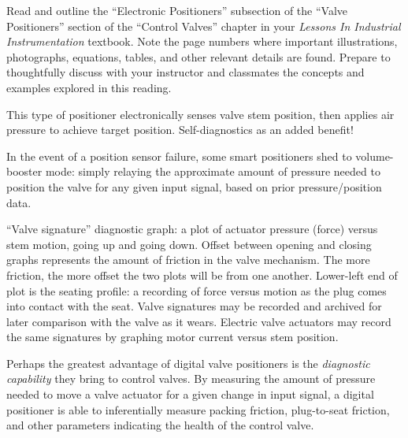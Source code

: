 

Read and outline the ``Electronic Positioners'' subsection of the ``Valve Positioners'' section of the ``Control Valves'' chapter in your {\it Lessons In Industrial Instrumentation} textbook.  Note the page numbers where important illustrations, photographs, equations, tables, and other relevant details are found.  Prepare to thoughtfully discuss with your instructor and classmates the concepts and examples explored in this reading.







 






This type of positioner electronically senses valve stem position, then applies air pressure to achieve target position.  Self-diagnostics as an added benefit!

\vskip 10pt

In the event of a position sensor failure, some smart positioners shed to volume-booster mode: simply relaying the approximate amount of pressure needed to position the valve for any given input signal, based on prior pressure/position data.

\vskip 10pt

``Valve signature'' diagnostic graph: a plot of actuator pressure (force) versus stem motion, going up and going down.  Offset between opening and closing graphs represents the amount of friction in the valve mechanism.  The more friction, the more offset the two plots will be from one another.  Lower-left end of plot is the seating profile: a recording of force versus motion as the plug comes into contact with the seat.  Valve signatures may be recorded and archived for later comparison with the valve as it wears.  Electric valve actuators may record the same signatures by graphing motor current versus stem position.


\vskip 10pt

Perhaps the greatest advantage of digital valve positioners is the {\it diagnostic capability} they bring to control valves.  By measuring the amount of pressure needed to move a valve actuator for a given change in input signal, a digital positioner is able to inferentially measure packing friction, plug-to-seat friction, and other parameters indicating the health of the control valve.









